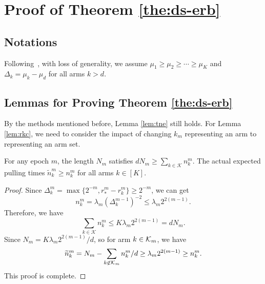 \section{Proof of Theorem \ref{the:ds-erb}}
\label{ape:ds}
\subsection{Notations}
Following~\citep{zimmert2019beating,dann2023blackbox}, with loss of generality, we assume $\mu_1 \geq \mu_2 \geq \cdots \geq \mu_K$ and $\Delta_k = \mu_k - \mu_d$ for all arms $k > d$.

\subsection{Lemmas for Proving Theorem \ref{the:ds-erb}}

By the methods mentioned before, Lemma \ref{lem:tne} still holds.
For Lemma \ref{lem:rkc}, we need to consider the impact of changing $k_m$ representing an arm to representing an arm set.

\begin{lemma}
\label{lem:rkcsemi}    %
    For any epoch $m$, the length $N_m$ satisfies $d N_m \geq \sum_{k \in \mathcal{K}}n_k^m$. The actual expected pulling times $\widetilde{n}_k^m \geq n_k^m$ for all arms $k \in [K]$.
\end{lemma}
\begin{proof}
    Since $\Delta_k^m = \max \{2^{-m}, r_*^m - r_k^m\} \geq 2^{-m}$, we can get
    \[n_k^m = \lambda_m (\Delta_k^{m-1})^{-2} \leq \lambda_m 2^{2(m-1)}.\]
    Therefore, we have
    \[\sum_{k \in \mathcal{K}}n_k^m \leq K \lambda_m 2^{2(m-1)} = d N_m.\]
    Since $N_m = K \lambda_m 2^{2(m-1)} / d$, so for arm $k \in {\mathcal{K}}_m$, we have
    \[\widetilde{n}_{k}^m = N_m  - \sum_{k \not\in {\mathcal{K}}_m} n_k^m /d \geq \lambda_m 2^{2(m-1)} \geq n_k^m.\]
    This proof is complete.
\end{proof}

